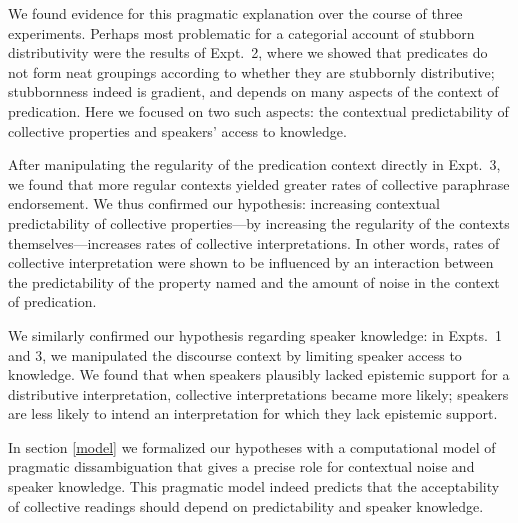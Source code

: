 \documentclass[linguex]{sp}
\newcommand{\ndg}[1]{\textcolor{Green}{[ndg: #1]}}
\begin{document}

We found evidence for this pragmatic explanation over the course of three experiments. Perhaps most problematic for a categorial account of stubborn distributivity were the results of Expt.~2, where we showed that predicates do not form neat groupings according to whether they are stubbornly distributive; stubbornness indeed is gradient, and depends on many aspects of the context of predication. Here we focused on two such aspects: the contextual predictability of collective properties and speakers' access to knowledge.

After manipulating the regularity of the predication context directly in Expt.~3, we found that more regular contexts yielded greater rates of collective paraphrase endorsement. We thus confirmed our hypothesis: increasing contextual predictability of collective properties---by increasing the regularity of the contexts themselves---increases rates of collective interpretations. In other words, rates of collective interpretation were shown to be influenced by an interaction between the predictability of the property named and the amount of noise in the context of predication. 

We similarly confirmed our hypothesis regarding speaker knowledge: in Expts.~1 and 3, we manipulated the discourse context by limiting speaker access to knowledge. We found that when speakers plausibly lacked epistemic support for a distributive interpretation, collective interpretations became more likely; speakers are less likely to intend an interpretation for which they lack epistemic support.

In section \ref{model} we formalized our hypotheses with a computational model of pragmatic dissambiguation that gives a precise role for contextual noise and speaker knowledge. This pragmatic model indeed predicts that the acceptability of collective readings should depend on predictability and speaker knowledge. 
\end{document}
